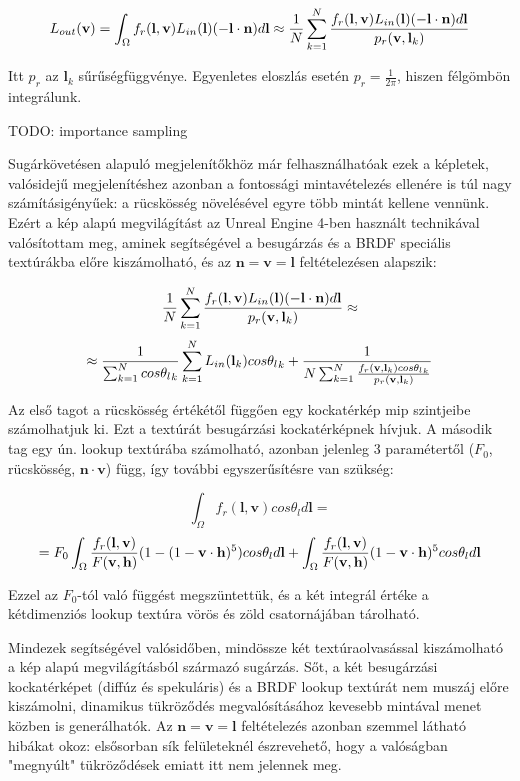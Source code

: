\[
L_{out}(\mathbf{v}) = \int_{\Omega} { f_r(\mathbf{l}, \mathbf{v}) L_{in}(\mathbf{l})(-\mathbf{l} \cdot \mathbf{n}) d\mathbf{l} } \approx { 1 \over N } \sum_{k=1}^{N} { { f_r(\mathbf{l}, \mathbf{v}) L_{in}(\mathbf{l})(-\mathbf{l} \cdot \mathbf{n}) d\mathbf{l} } \over { p_r(\mathbf{v}, \mathbf{l}_k) } }
\]

Itt \(p_r\) az \(\mathbf{l}_k\) sűrűségfüggvénye. Egyenletes eloszlás esetén \(p_r = \frac{1}{2\pi}\), hiszen félgömbön integrálunk.

TODO: importance sampling

Sugárkövetésen alapuló megjelenítőkhöz már felhasználhatóak ezek a képletek, valósidejű megjelenítéshez azonban a fontossági mintavételezés ellenére is túl nagy számításigényűek: a rücskösség növelésével egyre több mintát kellene vennünk. Ezért a kép alapú megvilágítást az Unreal Engine 4-ben használt technikával~\cite{karis2013real} valósítottam meg, aminek segítségével a besugárzás és a BRDF speciális textúrákba előre kiszámolható, és az \(\mathbf{n} = \mathbf{v} = \mathbf{l}\) feltételezésen alapszik:

\[
{ 1 \over N } \sum_{k=1}^{N} { { f_r(\mathbf{l}, \mathbf{v}) L_{in}(\mathbf{l})(-\mathbf{l} \cdot \mathbf{n}) d\mathbf{l} } \over { p_r(\mathbf{v}, \mathbf{l}_k) } } \approx
\]
\[
\approx { { 1 \over \sum_{k=1}^{N} cos{\theta_l}_k } \sum_{k=1}^{N} L_{in}(\mathbf{l}_k)cos{\theta_l}_k } + { 1 \over N \sum_{k=1}^{N} { { f_r(\mathbf{v}, \mathbf{l}_k) cos{\theta_l}_k} \over { p_r(\mathbf{v}, \mathbf{l}_k) } } }
\]

Az első tagot a rücskösség értékétől függően egy kockatérkép mip szintjeibe számolhatjuk ki. Ezt a textúrát besugárzási kockatérképnek hívjuk. A második tag egy ún. lookup textúrába számolható, azonban jelenleg 3 paramétertől (\(F_0\), rücskösség, \(\mathbf{n} \cdot \mathbf{v}\)) függ, így további egyszerűsítésre van szükség:

\[
\int_{\Omega} { f_r(\mathbf{l}, \mathbf{v}) cos\theta_l d\mathbf{l} } =
\]
\[= F_0 \int_{\Omega} { { f_r(\mathbf{l}, \mathbf{v}) \over F(\mathbf{v}, \mathbf{h}) } (1 - (1 - \mathbf{v} \cdot \mathbf{h})^5) cos\theta_l d\mathbf{l} } + \int_{\Omega} { { f_r(\mathbf{l}, \mathbf{v}) \over F(\mathbf{v}, \mathbf{h}) } (1 - \mathbf{v} \cdot \mathbf{h})^5 cos\theta_l d\mathbf{l} }
\]

Ezzel az \(F_0\)-tól való függést megszüntettük, és a két integrál értéke a kétdimenziós lookup textúra vörös és zöld csatornájában tárolható.

Mindezek segítségével valósidőben, mindössze két textúraolvasással kiszámolható a kép alapú megvilágításból származó sugárzás. Sőt, a két besugárzási kockatérképet (diffúz és spekuláris) és a BRDF lookup textúrát nem muszáj előre kiszámolni, dinamikus tükröződés megvalósításához kevesebb mintával menet közben is generálhatók. Az \(\mathbf{n} = \mathbf{v} = \mathbf{l}\) feltételezés azonban szemmel látható hibákat okoz: elsősorban sík felületeknél észrevehető, hogy a valóságban "megnyúlt" tükröződések emiatt itt nem jelennek meg.


